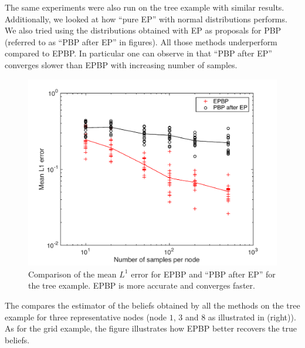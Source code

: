 %
%
%
The same experiments were also run on the tree example with similar results.
Additionally, we looked at how ``pure EP'' with normal distributions performs. We also tried using the distributions obtained with EP as proposals for PBP (referred to as ``PBP after EP'' in figures). All those methods underperform compared to EPBP. In particular one can observe in  that ``PBP after EP'' converges slower than EPBP with increasing number of samples.
%
%
%
\begin{figure}[!h]
\center
\includegraphics[width=.6\textwidth]{figures/epbp/errComparisonEP}
\caption{\label{compPBPaEP}Comparison of the mean $L^{1}$ error for EPBP and ``PBP after EP'' for the tree example. EPBP is more accurate and converges faster.}
\end{figure}


The  compares the estimator of the beliefs obtained by all the methods on the tree example for three representative nodes (node $1$, $3$ and $8$ as illustrated in  (right)). As for the grid example, the figure illustrates how EPBP better recovers the true beliefs. 



